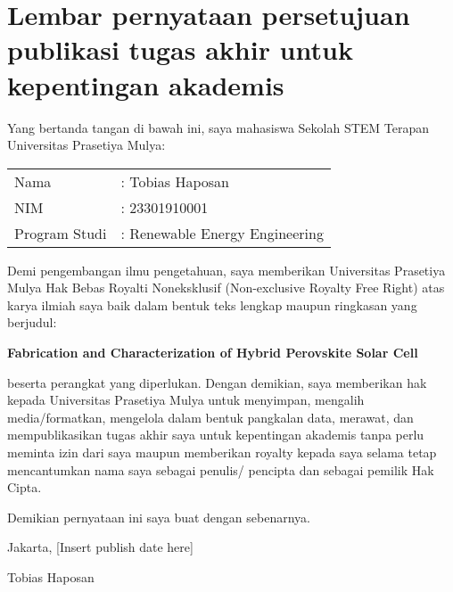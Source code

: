 \section*{Lembar pernyataan persetujuan publikasi tugas akhir untuk kepentingan akademis}
\noindent Yang bertanda tangan di bawah ini, saya mahasiswa Sekolah STEM Terapan Universitas Prasetiya Mulya: \par
\vspace{1cm}
\begin{tabular}{l l}
    Nama           & : Tobias Haposan \\
    NIM            & : 23301910001 \\
    Program Studi  & : Renewable Energy Engineering \\
\end{tabular} \vspace{1cm} \par
\noindent Demi pengembangan ilmu pengetahuan, saya memberikan Universitas Prasetiya Mulya Hak Bebas Royalti Noneksklusif (Non-exclusive Royalty Free Right) atas karya ilmiah saya baik dalam bentuk teks lengkap maupun ringkasan yang berjudul: \par
\begin{center}
    \textbf{Fabrication and Characterization of Hybrid Perovskite Solar Cell}
\end{center} \par
\noindent beserta perangkat yang diperlukan. Dengan demikian, saya memberikan hak kepada Universitas Prasetiya Mulya untuk menyimpan, mengalih media/formatkan, mengelola dalam bentuk pangkalan data, merawat, dan mempublikasikan tugas akhir saya untuk kepentingan akademis tanpa perlu meminta izin dari saya maupun memberikan royalty kepada saya selama tetap mencantumkan nama saya sebagai penulis/ pencipta dan sebagai pemilik Hak Cipta. \par
\vspace{1cm} \noindent Demikian pernyataan ini saya buat dengan sebenarnya. \par
\vspace{4cm}
\noindent Jakarta, [Insert publish date here] \par
\vspace{1cm}
\noindent Tobias Haposan

